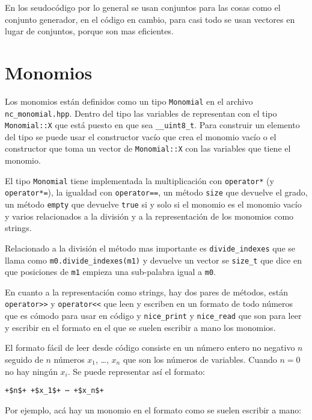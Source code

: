 \documentclass{report}
\theoremstyle{customstyle}
\theoremstyle{factstyle}
\begin{document}
En los seudocódigo por lo general se usan conjuntos para las cosas como el conjunto generador, en el código en cambio, para casi todo se usan vectores en lugar de conjuntos, porque son mas eficientes.

\section{Monomios}

Los monomios están definidos como un tipo \texttt{Monomial} en el archivo \texttt{nc\_monomial.hpp}. Dentro del tipo las variables de representan con el tipo \texttt{Monomial::X} que está puesto en que sea \texttt{\_\_uint8\_t}. Para construir un elemento del tipo se puede usar el constructor vacío que crea el monomio vacío o el constructor que toma un vector de \texttt{Monomial::X} con las variables que tiene el monomio.

El tipo \texttt{Monomial} tiene implementada la multiplicación con \texttt{operator*} (y \texttt{operator*=}), la igualdad con \texttt{operator==}, un método \texttt{size} que devuelve el grado, un método \texttt{empty} que devuelve \texttt{true} si y solo si el monomio es el monomio vacío y varios relacionados a la división y a la representación de los monomios como strings.

Relacionado a la división el método mas importante es \texttt{divide\_indexes} que se llama como \texttt{m0.divide\_indexes(m1)} y devuelve un vector se \texttt{size\_t} que dice en que posiciones de \texttt{m1} empieza una sub-palabra igual a \texttt{m0}.

En cuanto a la representación como strings, hay dos pares de métodos, están \texttt{operator>>} y \texttt{operator<<} que leen y escriben en un formato de todo números que es cómodo para usar en código y \texttt{nice\_print} y \texttt{nice\_read} que son para leer y escribir en el formato en el que se suelen escribir a mano los monomios.

El formato fácil de leer desde código consiste en un número entero no negativo $n$ seguido de $n$ números $x_1$, …, $x_n$ que son los números de variables. Cuando $n = 0$ no hay ningún $x_i$. Se puede representar así el formato:

\begin{lstlisting}[escapechar=+]
  +$n$+ +$x_1$+ ⋯ +$x_n$+
\end{lstlisting}

Por ejemplo, acá hay un monomio en el formato como se suelen escribir a mano:
\end{document}
